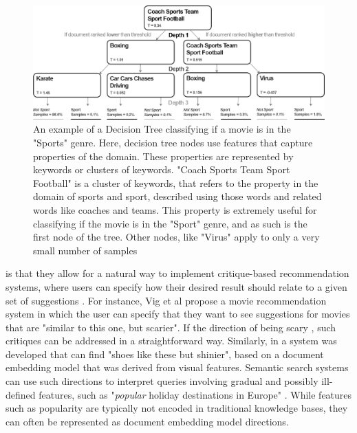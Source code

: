 \begin{figure}[t]\label{ch1:introdectree}
	\includegraphics[width=450px]{images/decision_tree_ex.png}
	\centering
	\caption{An example of a Decision Tree classifying if a movie is in the "Sports" genre. Here,  decision tree nodes use features that capture properties of the domain. These properties are represented by keywords or clusters of keywords.  "Coach Sports Team Sport Football" is a cluster of keywords, that refers to the property in the domain of sports and sport, described using those words and related words like coaches and teams. This  property is extremely useful for classifying if the movie is in the "Sport" genre, and as such is the first node of the tree. Other nodes, like "Virus" apply to only a very small number of samples}
\end{figure}


  is  that they allow for a natural way to implement critique-based recommendation systems, where users can specify how their desired result should relate to a given set of suggestions \cite{Viappiani2006}. For instance, Vig et al \cite{Vig2014} propose a movie recommendation system in which the user can specify that they want to see suggestions for movies that are "similar to this one, but scarier". If the direction of being scary , such critiques can be addressed in a straightforward way. Similarly, in \cite{Kovashka} a system was developed that can find "shoes like these but shinier", based on a document embedding model that was derived from visual features. Semantic search systems can use such directions to interpret queries involving gradual and possibly ill-defined features, such as "\emph{popular} holiday destinations in Europe" \cite{Jameel}. While features such as popularity are typically not encoded in traditional knowledge bases, they can often be represented as document embedding model directions.%

